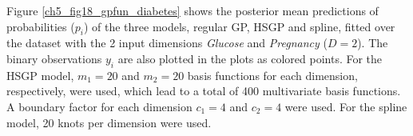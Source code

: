 \documentclass[onecolumn,a4paper,11pt]{article}
\begin{document}
Figure \ref{ch5_fig18_gpfun_diabetes} shows the posterior mean predictions of probabilities ($p_i$) of the three models, regular GP, HSGP and spline, fitted over the dataset with the 2 input dimensions \textit{Glucose} and \textit{Pregnancy} ($D=2$). The binary observations $y_i$ are also plotted in the plots as colored points. For the HSGP model, $m_1=20$ and $m_2=20$ basis functions for each dimension, respectively, were used, which lead to a total of 400 multivariate basis functions. A boundary factor for each dimension $c_1=4$ and $c_2=4$ were used. For the spline model, 20 knots per dimension were used.
%
\begin{figure}
\centering
{}

\end{figure}
\end{document}
